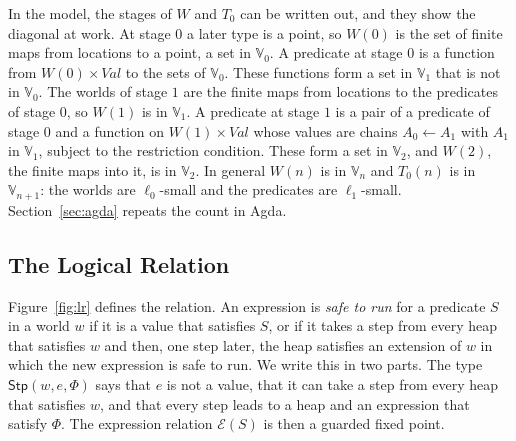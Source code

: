 \documentclass[acmsmall,nonacm,screen]{acmart}
\newcommand{\Vg}{\mathbb{V}}
\newcommand{\Val}{\mathit{Val}}
\newcommand{\Wld}{W}
\newcommand{\Pred}{T}
\newcommand{\Stp}{\mathsf{Stp}}
\newcommand{\Er}{\mathcal{E}}
\begin{document}
\begin{example}\label{ex:stages}
In the model, the stages of $\Wld$ and $\Pred_0$ can be written out, and they show the
diagonal at work. At stage $0$ a later type is a point, so $\Wld(0)$ is the set of finite
maps from locations to a point, a set in $\Vg_0$. A predicate at stage $0$ is a function
from $\Wld(0) \times \Val$ to the sets of $\Vg_0$. These functions form a set in $\Vg_1$
that is not in $\Vg_0$. The worlds of stage $1$ are the finite maps from locations to the
predicates of stage $0$, so $\Wld(1)$ is in $\Vg_1$. A predicate at stage $1$ is a pair of
a predicate of stage $0$ and a function on $\Wld(1) \times \Val$ whose values are chains
$A_0 \leftarrow A_1$ with $A_1$ in $\Vg_1$, subject to the restriction condition. These
form a set in $\Vg_2$, and $\Wld(2)$, the finite maps into it, is in $\Vg_2$. In general
$\Wld(n)$ is in $\Vg_n$ and $\Pred_0(n)$ is in $\Vg_{n+1}$: the worlds are $\ell_0$-small and
the predicates are $\ell_1$-small. Section~\ref{sec:agda} repeats the count in Agda.
\end{example}

\subsection{The Logical Relation}

Figure~\ref{fig:lr} defines the relation. An expression is \emph{safe to run} for a
predicate $S$ in a world $w$ if it is a value that satisfies $S$, or if it takes a step from
every heap that satisfies $w$ and then, one step later, the heap satisfies an extension of
$w$ in which the new expression is safe to run. We write this in two parts. The type
$\Stp(w,e,\Phi)$ says that $e$ is not a value, that it can take a step from every heap that
satisfies $w$, and that every step leads to a heap and an expression that satisfy $\Phi$.
The expression relation $\Er(S)$ is then a guarded fixed point.
\end{document}
